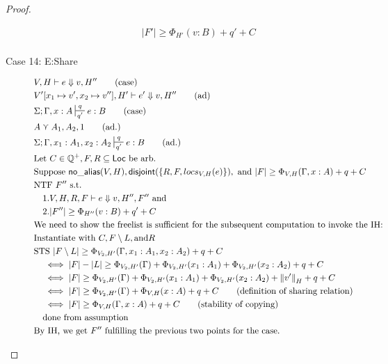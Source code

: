 \documentclass[11pt]{article}
\newcommand{\ms}[1]{\ensuremath{\mathsf{#1}}}
\newcommand{\na}[1]{\mathsf{no\_alias}(#1)}
\newcommand{\dist}[1]{\mathsf{disjoint}(#1)}
\newcommand{\ssize}[2]{\left\Vert #2 \right\Vert_{#1}}
\theoremstyle{definition}
\begin{document}
\begin{proof}
\begin{description}
\begin{align*}
  &|F'| \ge \Phi_{H'}(v:B) + q' + C \tag{From the IH}\\
  \end{align*}
  \item[Case 14: E:Share]
	\begin{align*}
	&V,H \vdash e \Downarrow v,H'' \tag{case}\\
	&V'[x_1 \mapsto v',x_2 \mapsto v''], H' \vdash e' \Downarrow v,H'' \tag{ad}\\
	&\Sigma;\Gamma,x:A \sststile{q'}{q} e : B \tag{case}\\
	&A \curlyvee A_1,A_2,1 \tag{ad.}\\
	&\Sigma; \Gamma,x_1:A_1,x_2:A_2 \sststile{q'}{q} e : B \tag{ad.}\\
  &\text{Let } C \in \mathbb{Q}^+, F,R \subseteq \ms{Loc} \text{ be arb.}\\
  &\text{Suppose }  \na{V,H}, \dist{\{R,F,locs_{V,H}(e)\}}, \text{ and } |F| 
		\ge \Phi_{V,H}(\Gamma,x:A) + q + C\\
  &\text{NTF } F'' \text{ s.t. }\\
  &\quad 1. V,H,R,F \vdash e \Downarrow v, H'',F'' \text{ and }\\ 
  &\quad 2. |F''| \ge \Phi_{H''}(v:B) + q' + C\\
	&\text{We need to show the freelist is sufficient for the subsequent computation to invoke the IH:}\\
	&\text{Instantiate with } C, F \setminus L, \text{and} R\\
	&\text{STS } |F\setminus L| \ge \Phi_{V_2, H'}(\Gamma,x_1 : A_1,x_2 : A_2) + q + C\\
	&\quad \iff |F| - |L| \ge \Phi_{V_2,H'}(\Gamma) + 
			\Phi_{V_2,H'}(x_1 : A_1) + \Phi_{V_2,H'}(x_2 : A_2) + q + C\\
	&\quad \iff |F| \ge \Phi_{V_2,H'}(\Gamma) + 
			\Phi_{V_2,H'}(x_1 : A_1) + \Phi_{V_2,H'}(x_2 : A_2) + \ssize{H}{v'} + q + C\\
	&\quad \iff |F| \ge \Phi_{V_2,H'}(\Gamma) + 
			\Phi_{V,H}(x : A) + q + C \tag{definition of sharing relation}\\
	&\quad \iff |F| \ge \Phi_{V,H}(\Gamma,x:A) + q + C \tag{stability of copying}\\
	&\quad \text{done from assumption}\\
	&\text{By IH, we get } F'' \text{ fulfilling the previous two points for the case. }\\
	\end{align*}
  \end{description}
\end{proof}
\end{document}

